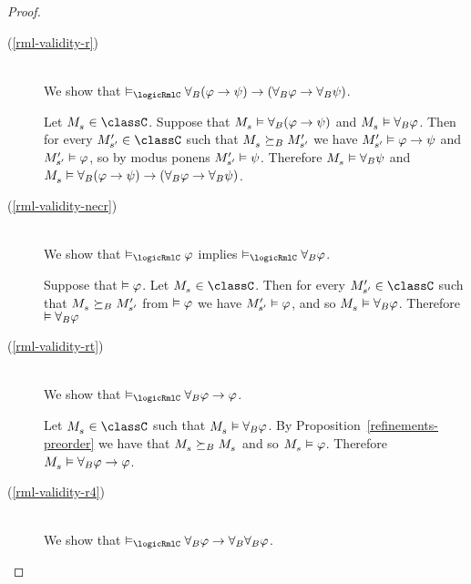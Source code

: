 \begin{proof}
\begin{description}
    \item[(\ref{rml-validity-r})]  \hfill \\
        We show that $\entails_\logicRmlC \allrefsBs (\phi \implies \psi) \implies (\allrefsBs \phi \implies \allrefsBs \psi)$.

        Let $\kPModel{\kStateS} \in \classC$.
        Suppose that $\kPModel{\kStateS} \entails \allrefsBs (\phi \implies \psi)$ and $\kPModel{\kStateS} \entails \allrefsBs \phi$.
        Then for every $\kPModelP{\kStateSP} \in \classC$
        such that $\kPModel{\kStateS} \simulatesBs \kPModelP{\kStateSP}$
        we have ${M^{\prime}_{{s}^{\prime}}} \vDash \varphi \rightarrow \psi$
        and ${M^{\prime}_{{s}^{\prime}}} \vDash \varphi$,
        so by modus ponens ${M^{\prime}_{{s}^{\prime}}} \vDash \psi$.
        Therefore $\kPModel{\kStateS} \entails \allrefsBs \psi$
        and $\kPModel{\kStateS} \entails \allrefsBs (\phi \implies \psi) \implies (\allrefsBs \phi \implies \allrefsBs \psi)$.
\pagebreak
    \item[(\ref{rml-validity-necr})] \hfill \\
        We show that $\entails_\logicRmlC \phi$ implies $\entails_\logicRmlC \allrefsBs \phi$.

        Suppose that $\vDash \varphi$. 
        Let $\kPModel{\kStateS} \in \classC$.
        Then for every $\kPModelP{\kStateSP} \in \classC$
        such that $\kPModel{\kStateS} \simulatesBs \kPModelP{\kStateSP}$
        from $\vDash \varphi$
        we have ${M^{\prime}_{{s}^{\prime}}} \vDash \varphi$,
        and so $\kPModel{\kStateS} \entails \allrefsBs \phi$.
        Therefore $\vDash {\forall_{B}} \varphi$
    \item[(\ref{rml-validity-rt})] \hfill \\
        We show that $\entails_\logicRmlC \allrefsBs \phi \implies \phi$.

        Let $\kPModel{\kStateS} \in \classC$
        such that $\kPModel{\kStateS} \entails \allrefsBs \phi$.
        By Proposition~\ref{refinements-preorder} we have that $\kPModel{\kStateS} \simulatesBs \kPModel{\kStateS}$ and so $\kPModel{\kStateS} \entails \phi$.
        Therefore $\kPModel{\kStateS} \entails \allrefsBs \phi \implies \phi$.
    \item[(\ref{rml-validity-r4})] \hfill \\
        We show that $\entails_\logicRmlC \allrefsBs \phi \implies \allrefsBs \allrefsBs \phi$.


\end{description}
\end{proof}
